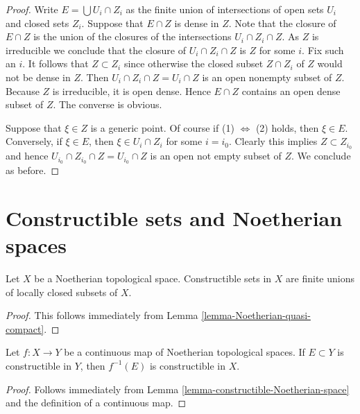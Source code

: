 \begin{proof}
Write $E = \bigcup U_i \cap Z_i$ as the finite union of
intersections of open sets $U_i$ and closed sets $Z_i$.
Suppose that $E \cap Z$ is dense in $Z$. Note that
the closure of $E \cap Z$ is the union of the closures
of the intersections $U_i \cap Z_i \cap Z$. As $Z$ is irreducible we
conclude that the closure of $U_i \cap Z_i \cap Z$ is $Z$ for some $i$.
Fix such an $i$. It follows that $Z \subset Z_i$ since otherwise
the closed subset $Z \cap Z_i$ of $Z$ would not be dense in $Z$.
Then $U_i \cap Z_i \cap Z = U_i \cap Z$ is an open nonempty subset of $Z$.
Because $Z$ is irreducible, it is open dense. Hence $E \cap Z$
contains an open dense subset of $Z$.
The converse is obvious.

\medskip\noindent
Suppose that $\xi \in Z$ is a generic point. Of course if
(1) $\Leftrightarrow$ (2) holds, then $\xi \in E$. Conversely,
if $\xi \in E$, then $\xi \in U_i \cap Z_i$ for some $i = i_0$.
Clearly this implies $Z \subset Z_{i_0}$ and hence
$U_{i_0} \cap Z_{i_0} \cap Z = U_{i_0} \cap Z$ is an open
not empty subset of $Z$. We conclude as before.
\end{proof}







\section{Constructible sets and Noetherian spaces}
\label{section-constructible-Noetherian}

\begin{lemma}
\label{lemma-constructible-Noetherian-space}
Let $X$ be a Noetherian topological space.
Constructible sets in $X$ are finite unions
of locally closed subsets of $X$.
\end{lemma}

\begin{proof}
This follows immediately from
Lemma \ref{lemma-Noetherian-quasi-compact}.
\end{proof}

\begin{lemma}
\label{lemma-constructible-map-Noetherian}
Let $f : X \to Y$ be a continuous map of Noetherian topological spaces.
If $E \subset Y$ is constructible in $Y$, then $f^{-1}(E)$ is constructible
in $X$.
\end{lemma}

\begin{proof}
Follows immediately from
Lemma \ref{lemma-constructible-Noetherian-space}
and the definition of a continuous map.
\end{proof}

